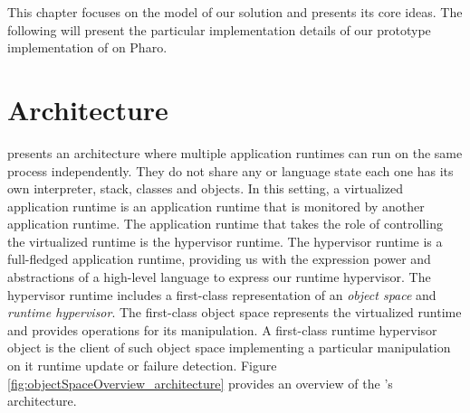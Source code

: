 This chapter focuses on the model of our solution and presents its core ideas. The following  will present the particular implementation details of our prototype implementation of \Vtt on Pharo.





\section{\Vtt Architecture} \label{sec:virtualization_overview}

\Vtt presents an architecture where multiple application runtimes can run on the same process independently. They do not share any \VM or language state \ie each one has its own interpreter, stack, classes and objects. In this setting, a virtualized application runtime is an application runtime that is monitored by another application runtime. The application runtime that takes the role of controlling the virtualized runtime is the hypervisor runtime. The hypervisor runtime is a full-fledged application runtime, providing us with the expression power and abstractions of a high-level language to express our runtime hypervisor. The hypervisor runtime includes a first-class representation of an \emph{object space} and \emph{runtime hypervisor}. The first-class object space represents the virtualized runtime and provides operations for its manipulation. A first-class runtime hypervisor object is the client of such object space implementing a particular manipulation on it \eg runtime update or failure detection. Figure \ref{fig:objectSpaceOverview_architecture} provides an overview of the \Vtt's architecture.


